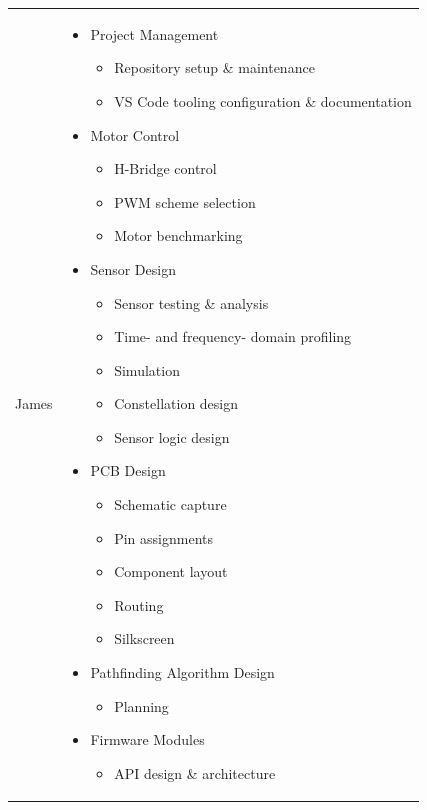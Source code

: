 \documentclass[conference]{IEEEtran}
\begin{document}
\begin{tabularx}{\linewidth}{ | c | X | }
	\hline
	James & \begin{itemize}
		        \item Project Management
		              \begin{itemize}
			      \item Repository setup \& maintenance
			      \item VS Code tooling configuration \& documentation
		      \end{itemize}
		        \item Motor Control
		              \begin{itemize}
			      \item H-Bridge control
			      \item PWM scheme selection
			      \item Motor benchmarking
		      \end{itemize}
		        \item Sensor Design
		              \begin{itemize}
			      \item Sensor testing \& analysis
			      \item Time- and frequency- domain profiling
			      \item Simulation
			      \item Constellation design
			      \item Sensor logic design
		      \end{itemize}
		        \item PCB Design
		              \begin{itemize}
			      \item Schematic capture
			      \item Pin assignments
			      \item Component layout
			      \item Routing
			      \item Silkscreen
		      \end{itemize}
		        \item Pathfinding Algorithm Design
		              \begin{itemize}
			      \item Planning
		      \end{itemize}
		        \item Firmware Modules
		              \begin{itemize}
			      \item API design \& architecture

\end{itemize}
\end{itemize}
\end{tabularx}
\end{document}
